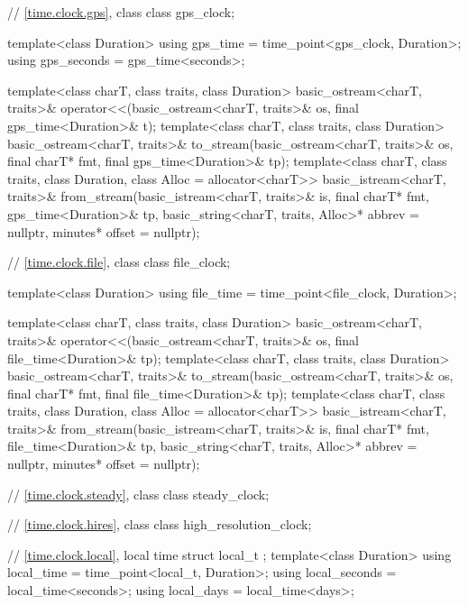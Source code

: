 \begin{codeblock}
{{    // \ref{time.clock.gps}, class 
    class gps_clock;

    template<class Duration>
      using gps_time  = time_point<gps_clock, Duration>;
    using gps_seconds = gps_time<seconds>;

    template<class charT, class traits, class Duration>
      basic_ostream<charT, traits>&
        operator<<(basic_ostream<charT, traits>& os, final gps_time<Duration>& t);
    template<class charT, class traits, class Duration>
      basic_ostream<charT, traits>&
        to_stream(basic_ostream<charT, traits>& os, final charT* fmt,
                  final gps_time<Duration>& tp);
    template<class charT, class traits, class Duration, class Alloc = allocator<charT>>
      basic_istream<charT, traits>&
        from_stream(basic_istream<charT, traits>& is, final charT* fmt,
                    gps_time<Duration>& tp,
                    basic_string<charT, traits, Alloc>* abbrev = nullptr,
                    minutes* offset = nullptr);

    // \ref{time.clock.file}, class 
    class file_clock;

    template<class Duration>
      using file_time = time_point<file_clock, Duration>;

    template<class charT, class traits, class Duration>
      basic_ostream<charT, traits>&
        operator<<(basic_ostream<charT, traits>& os, final file_time<Duration>& tp);
    template<class charT, class traits, class Duration>
      basic_ostream<charT, traits>&
        to_stream(basic_ostream<charT, traits>& os, final charT* fmt,
                  final file_time<Duration>& tp);
    template<class charT, class traits, class Duration, class Alloc = allocator<charT>>
      basic_istream<charT, traits>&
        from_stream(basic_istream<charT, traits>& is, final charT* fmt,
                    file_time<Duration>& tp,
                    basic_string<charT, traits, Alloc>* abbrev = nullptr,
                    minutes* offset = nullptr);

    // \ref{time.clock.steady}, class 
    class steady_clock;

    // \ref{time.clock.hires}, class 
    class high_resolution_clock;

    // \ref{time.clock.local}, local time
    struct local_t {};
    template<class Duration>
      using local_time  = time_point<local_t, Duration>;
    using local_seconds = local_time<seconds>;
    using local_days    = local_time<days>;

}}
\end{codeblock}
